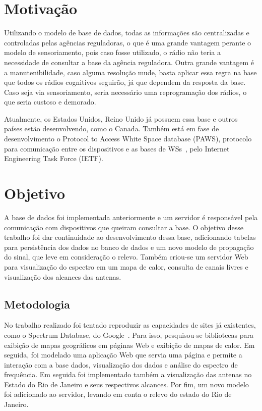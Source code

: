 \section{Motivação}

Utilizando o modelo de base de dados, todas as informações são centralizadas e controladas pelas agências reguladoras, o que é uma grande vantagem perante o modelo de sensoriamento, pois caso fosse utilizado, o rádio não teria a necessidade de consultar a base da agência reguladora. Outra grande vantagem é a manutenibilidade, caso alguma resolução mude, basta aplicar essa regra na base que todos os rádios cognitivos seguirão, já que dependem da resposta da base. Caso seja via sensoriamento, seria necessário uma reprogramação dos rádios, o que seria custoso e demorado.

Atualmente, os Estados Unidos, Reino Unido já possuem essa base e outros países estão desenvolvendo, como o Canada.
Também está em fase de desenvolvimento o Protocol to Access White Space database (PAWS), protocolo para comunicação entre os dispositivos e as bases de WSs~\cite{RFC6953}, pelo Internet Engineering Task Force (IETF).


\section{Objetivo}

A base de dados foi implementada anteriormente e um servidor é responsável pela comunicação com dispositivos que queiram consultar a base. O objetivo desse trabalho foi dar continuidade ao desenvolvimento dessa base, adicionando tabelas para persistência dos dados no banco de dados e um novo modelo de propagação do sinal, que leve em consideração o relevo. Também criou-se um servidor Web para visualização do espectro em um mapa de calor, consulta de canais livres e visualização dos alcances das antenas.

\subsection{Metodologia}

No trabalho realizado foi tentado reproduzir as capacidades de sites já existentes, como o Spectrum Database, do Google~\cite{googlespectrumdatabase}. Para isso, pesquisou-se bibliotecas para exibição de mapas geográficos em páginas Web e exibição de mapas de calor. Em seguida, foi modelado uma aplicação Web que servia uma página e permite a interação com a base dados, visualização dos dados e análise do espectro de frequência. Em seguida foi implementado também a visualização das antenas no Estado do Rio de Janeiro e seus respectivos alcances. Por fim, um novo modelo foi adicionado ao servidor, levando em conta o relevo do estado do Rio de Janeiro.


